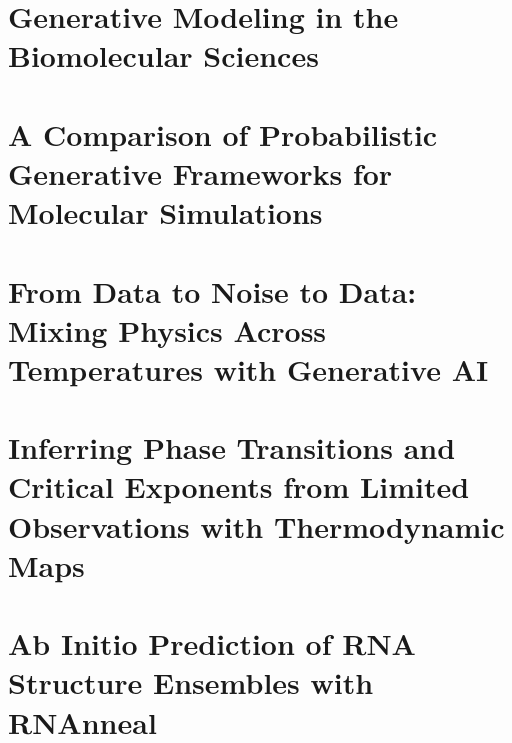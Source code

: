 \documentclass[12pt]{report}
\begin{document}
\doublespacing
\pagestyle{empty}
\hypersetup{pageanchor=false}

\clearpage

\clearpage

\clearpage
\hypersetup{pageanchor=true}
\pagestyle{plain}
\setcounter{page}{2}
{}

\clearpage

\singlespacing
{}
{}
\tableofcontents
\clearpage
{}
{}
\listoftables
\clearpage
{}
{}
\listoffigures
\clearpage
{}
{}

\clearpage
{}
{}

\clearpage

\doublespacing
{}
\setcounter{page}{1}
\modulolinenumbers[1]
\linenumbers

\chapter{Generative Modeling in the Biomolecular Sciences}


\chapter{A Comparison of Probabilistic Generative Frameworks for Molecular Simulations}


\chapter{From Data to Noise to Data: Mixing Physics Across Temperatures with Generative AI}


\chapter{Inferring Phase Transitions and Critical Exponents from Limited Observations with Thermodynamic Maps}


\chapter{Ab Initio Prediction of RNA Structure Ensembles with RNAnneal}

\end{document}
